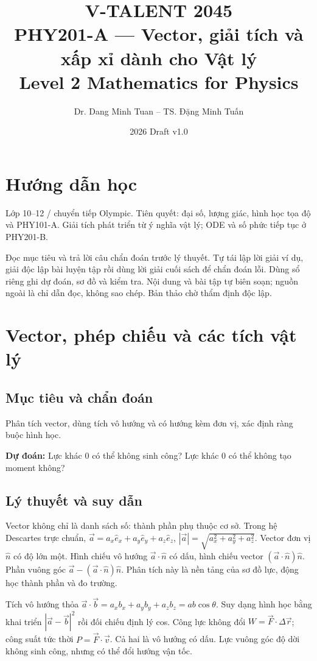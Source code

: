 \documentclass[11pt,a4paper,openany]{book}
\begin{document}
\title{V-TALENT 2045\\ PHY201-A --- Vector, giải tích và xấp xỉ dành cho Vật lý\\\large Level 2 \textbar{} Mathematics for Physics}
\author{Dr. Dang Minh Tuan -- TS. Đặng Minh Tuấn}
\date{2026 \textbar{} Draft v1.0}
\maketitle
\tableofcontents
\chapter*{Hướng dẫn học}
Lớp 10–12 / chuyển tiếp Olympic. Tiên quyết: đại số, lượng giác, hình học tọa độ và PHY101-A. Giải tích phát triển từ ý nghĩa vật lý; ODE và số phức tiếp tục ở PHY201-B.

Đọc mục tiêu và trả lời câu chẩn đoán trước lý thuyết. Tự tái lập lời giải ví dụ, giải độc lập bài luyện tập rồi dùng lời giải cuối sách để chẩn đoán lỗi. Dùng sổ riêng ghi dự đoán, sơ đồ và kiểm tra. Nội dung và bài tập tự biên soạn; nguồn ngoài là chỉ dẫn đọc, không sao chép. Bản thảo chờ thẩm định độc lập.
\chapter{Vector, phép chiếu và các tích vật lý}
\section{Mục tiêu và chẩn đoán}
Phân tích vector, dùng tích vô hướng và có hướng kèm đơn vị, xác định ràng buộc hình học.

\textbf{Dự đoán:} Lực khác 0 có thể không sinh công? Lực khác 0 có thể không tạo moment không?
\section{Lý thuyết và suy dẫn}
Vector không chỉ là danh sách số: thành phần phụ thuộc cơ sở. Trong hệ Descartes trực chuẩn, $\vec a=a_x\hat e_x+a_y\hat e_y+a_z\hat e_z$, $|\vec a|=\sqrt{a_x^2+a_y^2+a_z^2}$. Vector đơn vị $\hat n$ có độ lớn một. Hình chiếu vô hướng $\vec a\cdot\hat n$ có dấu, hình chiếu vector $(\vec a\cdot\hat n)\hat n$. Phần vuông góc $\vec a-(\vec a\cdot\hat n)\hat n$. Phân tích này là nền tảng của sơ đồ lực, động học thành phần và đo trường.

Tích vô hướng thỏa $\vec a\cdot\vec b=a_xb_x+a_yb_y+a_zb_z=ab\cos\theta$. Suy dạng hình học bằng khai triển $|\vec a-\vec b|^2$ rồi đối chiếu định lý cos. Công lực không đổi $W=\vec F\cdot\Delta\vec r$; công suất tức thời $P=\vec F\cdot\vec v$. Cả hai là vô hướng có dấu. Lực vuông góc độ dời không sinh công, nhưng có thể đổi hướng vận tốc.
\end{document}
